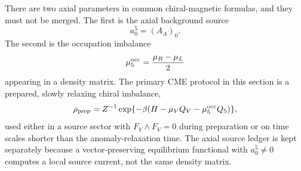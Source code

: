 There are two axial parameters in common chiral-magnetic formulas, and they
must not be merged.  The first is the axial background source
\[
  a_0^5=(A_A)_0 .
\]
The second is the occupation imbalance
\[
  \mu_5^{\rm occ}=\frac{\mu_R-\mu_L}{2}
\]
appearing in a density matrix.  The primary CME protocol in this section is
a prepared, slowly relaxing chiral imbalance,
\begin{equation}
  \rho_{\rm prep}
  =
  Z^{-1}\exp\{-\beta(H-\mu_VQ_V-\mu_5^{\rm occ}Q_5)\},
  \label{eq:cme-prepared-density-matrix}
\end{equation}
used either in a source sector with \(F_V\wedge F_V=0\) during preparation
or on time scales shorter than the anomaly-relaxation time.  The axial
source ledger is kept separately because a vector-preserving equilibrium
functional with \(a_0^5\ne0\) computes a local source current, not the same
density matrix.

